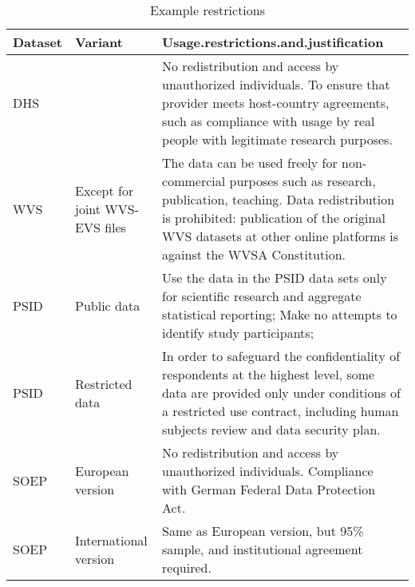 \begin{table}[h]
\centering
\caption{Example restrictions} 
\label{tab:restrictions}
\begin{tabular}{llp{4in}}
  \toprule
Dataset & Variant & Usage.restrictions.and.justification \\ 
  \midrule
DHS &  & No redistribution and access by unauthorized individuals. To ensure that provider meets host-country agreements, such as compliance with usage by  real people with legitimate research purposes. \\ 
  WVS & Except for joint WVS-EVS files & The data can be used freely for non-commercial purposes such as research, publication, teaching. Data redistribution is prohibited: publication of the original WVS datasets at other online platforms is against the WVSA Constitution. \\ 
  PSID & Public data & Use the data in the PSID data sets only for scientific research and aggregate statistical reporting; Make no attempts to identify study participants; \\ 
  PSID & Restricted data & In order to safeguard the confidentiality of respondents at the highest level, some data are provided only under conditions of a restricted use contract, including human subjects review and data security plan. \\ 
  SOEP & European version & No redistribution and access by unauthorized individuals. Compliance with  German Federal Data Protection Act. \\ 
  SOEP & International version & Same as European version, but 95\% sample, and institutional agreement required. \\ 
   \bottomrule
\end{tabular}
\end{table}
